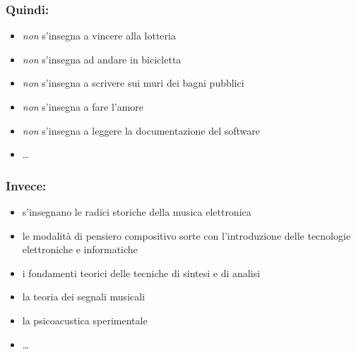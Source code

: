 \documentclass[compress,\mode]{beamer}
\begin{document}
\begin{frame}

  \frametitle<+->{Quindi:}

    \begin{itemize}[<+- | alert@+>]

       \item \emph{non} s'insegna a vincere alla lotteria

       \item \emph{non} s'insegna ad andare in bicicletta

       \item \emph{non} s'insegna a scrivere sui muri dei bagni pubblici

       \item \emph{non} s'insegna a fare l'amore

       \item \emph{non} s'insegna a leggere la documentazione del software

       \item \ldots

    \end{itemize}

\end{frame}

\begin{frame}

  \frametitle<+->{Invece:}

    \begin{itemize}[<+- | alert@+>]

       \item s'insegnano le radici storiche della musica elettronica

       \item le modalit\`a di pensiero compositivo sorte con l'introduzione
               delle tecnologie elettroniche e informatiche

       \item i fondamenti teorici delle tecniche di sintesi e di analisi

       \item la teoria dei segnali musicali

       \item la psicoacustica sperimentale

       \item \ldots

    \end{itemize}

\end{frame}
\end{document}

